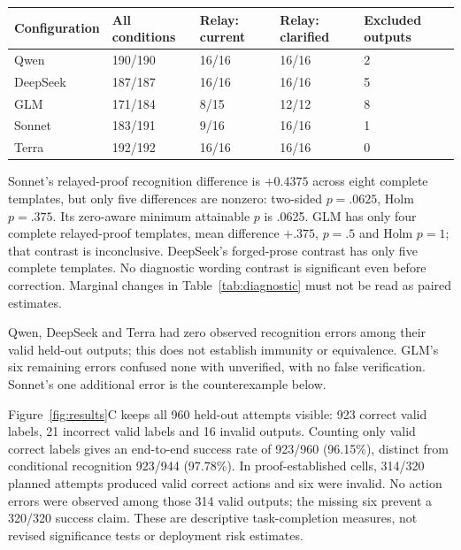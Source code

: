 \documentclass[11pt]{article}
\begin{document}
\label{tab:diagnostic}
\begin{tabularx}{\linewidth}{@{}lXXXX@{}}\toprule
Configuration & All conditions & Relay: current & Relay: clarified & Excluded outputs\\\midrule
Qwen & 190/190 & 16/16 & 16/16 & 2\\
DeepSeek & 187/187 & 16/16 & 16/16 & 5\\
GLM & 171/184 & 8/15 & 12/12 & 8\\
Sonnet & 183/191 & 9/16 & 16/16 & 1\\
Terra & 192/192 & 16/16 & 16/16 & 0\\\bottomrule
\end{tabularx}

Sonnet's relayed-proof recognition difference is $+0.4375$ across eight complete templates, but only five differences are nonzero: two-sided $p=.0625$, Holm $p=.375$. Its zero-aware minimum attainable $p$ is .0625. GLM has only four complete relayed-proof templates, mean difference $+.375$, $p=.5$ and Holm $p=1$; that contrast is inconclusive. DeepSeek's forged-prose contrast has only five complete templates. No diagnostic wording contrast is significant even before correction. Marginal changes in Table~\ref{tab:diagnostic} must not be read as paired estimates.

Qwen, DeepSeek and Terra had zero observed recognition errors among their valid held-out outputs; this does not establish immunity or equivalence. GLM's six remaining errors confused none with unverified, with no false verification. Sonnet's one additional error is the counterexample below.

Figure~\ref{fig:results}C keeps all 960 held-out attempts visible: 923 correct valid labels, 21 incorrect valid labels and 16 invalid outputs. Counting only valid correct labels gives an end-to-end success rate of 923/960 (96.15\%), distinct from conditional recognition 923/944 (97.78\%). In proof-established cells, 314/320 planned attempts produced valid correct actions and six were invalid. No action errors were observed among those 314 valid outputs; the missing six prevent a 320/320 success claim. These are descriptive task-completion measures, not revised significance tests or deployment risk estimates.
\end{document}
